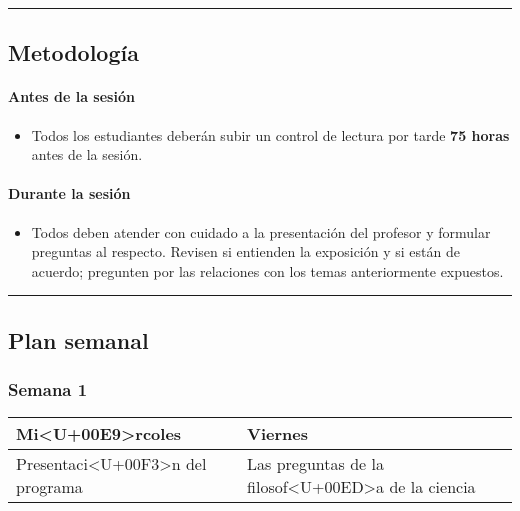 \documentclass[spanish,]{article}
\providecommand{\tightlist}{%
  \setlength{\itemsep}{0pt}\setlength{\parskip}{0pt}}
\let\oldparagraph\paragraph
\renewcommand{\paragraph}[1]{\oldparagraph{#1}\mbox{}}
\begin{document}
\begin{center}\rule{0.5\linewidth}{\linethickness}\end{center}

\subsection{Metodología}\label{metodologia}

\paragraph{\texorpdfstring{\textbf{Antes de la
sesión}}{Antes de la sesión}}\label{antes-de-la-sesion}

\begin{itemize}
\tightlist
\item
  Todos los estudiantes deberán subir un control de lectura por tarde
  \textbf{75 horas} antes de la sesión.
\end{itemize}

\paragraph{\texorpdfstring{\textbf{Durante la
sesión}}{Durante la sesión}}\label{durante-la-sesion}

\begin{itemize}
\tightlist
\item
  Todos deben atender con cuidado a la presentación del profesor y
  formular preguntas al respecto. Revisen si entienden la exposición y
  si están de acuerdo; pregunten por las relaciones con los temas
  anteriormente expuestos.
\end{itemize}

\begin{center}\rule{0.5\linewidth}{\linethickness}\end{center}

\subsection{Plan semanal}\label{plan-semanal}

\subsubsection{Semana 1}\label{semana-1}

\begin{tabular}{>{\raggedright\arraybackslash}p{30em}|>{\raggedright\arraybackslash}p{30em}}
\hline
Mi<U+00E9>rcoles & Viernes\\
\hline
Presentaci<U+00F3>n del programa & Las preguntas de la filosof<U+00ED>a de la ciencia\\
\hline
\end{tabular}
\end{document}
